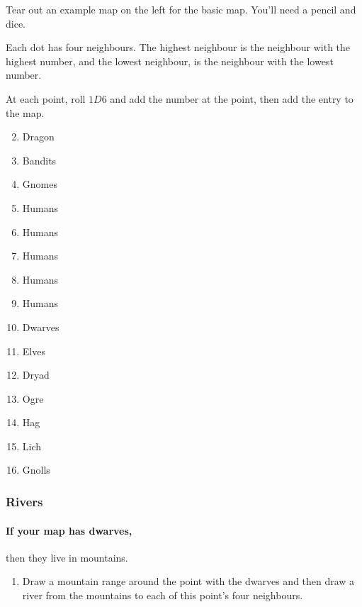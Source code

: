 \begin{multicols}{2}


Tear out an example map on the left for the basic map.
You'll need a pencil and dice.

Each dot has four neighbours.
The highest neighbour is the neighbour with the highest number, and the lowest neighbour, is the neighbour with the lowest number.

At each point, roll $1D6$ and add the number at the point, then add the entry to the map.

\begin{multicols}{2}

\begin{enumerate}
  \setcounter{enumi}{1}
  \item
  Dragon
  \item
  Bandits
  \item
  Gnomes
  \item
  Humans
  \item
  Humans
  \item
  Humans
  \item
  Humans
  \item
  Humans
  \item
  Dwarves
  \item
  Elves
  \item
  Dryad
  \item
  Ogre
  \item
  Hag
  \item
  Lich
  \item
  Gnolls
\end{enumerate}

\end{multicols}

\subsubsection{Rivers}

\paragraph{If your map has dwarves,}
then they live in mountains.

\begin{enumerate}
  \item
  Draw a mountain range around the point with the dwarves and then draw a river from the mountains to each of this point's four neighbours.


\end{enumerate}
\end{multicols}
